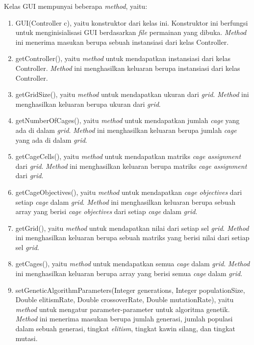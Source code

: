 Kelas GUI mempunyai beberapa \textit{method}, yaitu:

\begin{enumerate}
\item GUI(Controller c), yaitu konstruktor dari kelas ini. Konstruktor ini berfungsi untuk menginisialisasi GUI berdasarkan \textit{file} permainan yang dibuka. \textit{Method} ini menerima masukan berupa sebuah instansiasi dari kelas Controller.
\item getController(), yaitu \textit{method} untuk mendapatkan instansiasi dari kelas Controller. \textit{Method} ini menghasilkan keluaran berupa instansiasi dari kelas Controller.
\item getGridSize(), yaitu \textit{method} untuk mendapatkan ukuran dari \textit{grid}. \textit{Method} ini menghasilkan keluaran berupa ukuran dari \textit{grid}.
\item getNumberOfCages(), yaitu \textit{method} untuk mendapatkan jumlah \textit{cage} yang ada di dalam \textit{grid}. \textit{Method} ini menghasilkan keluaran berupa jumlah \textit{cage} yang ada di dalam \textit{grid}.
\item getCageCells(), yaitu \textit{method} untuk mendapatkan matriks \textit{cage assignment} dari \textit{grid}. \textit{Method} ini menghasilkan keluaran berupa matriks \textit{cage assignment} dari \textit{grid}.
\item getCageObjectives(), yaitu \textit{method} untuk mendapatkan \textit{cage objectives} dari setiap \textit{cage} dalam \textit{grid}. \textit{Method} ini menghasilkan keluaran berupa sebuah array yang berisi \textit{cage objectives} dari setiap \textit{cage} dalam \textit{grid}.
\item getGrid(), yaitu \textit{method} untuk mendapatkan nilai dari setiap sel \textit{grid}. \textit{Method} ini menghasilkan keluaran berupa sebuah matriks yang berisi nilai dari setiap sel \textit{grid}.
\item getCages(), yaitu \textit{method} untuk mendapatkan semua \textit{cage} dalam \textit{grid}. \textit{Method} ini menghasilkan keluaran berupa array yang berisi semua \textit{cage} dalam \textit{grid}.
\item setGeneticAlgorithmParameters(Integer generations, Integer populationSize, Double elitismRate, Double crossoverRate, Double mutationRate), yaitu \textit{method} untuk mengatur parameter-parameter untuk algoritma genetik. \textit{Method} ini menerima masukan berupa jumlah generasi, jumlah populasi dalam sebuah generasi, tingkat \textit{elitism}, tingkat kawin silang, dan tingkat mutasi.

\end{enumerate}
